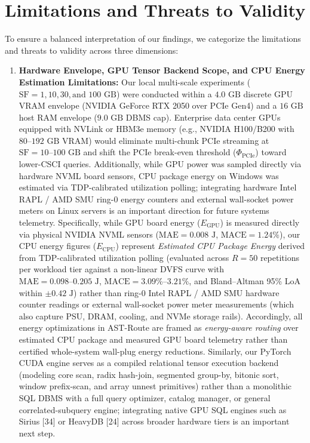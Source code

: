 \documentclass[10pt,a4paper]{article}
\begin{document}
\section{Limitations and Threats to Validity}
To ensure a balanced interpretation of our findings, we categorize the limitations and threats to validity across three dimensions:
\begin{enumerate}[leftmargin=1.5em,itemsep=2pt]
    \item \textbf{Hardware Envelope, GPU Tensor Backend Scope, and CPU Energy Estimation Limitations:} Our local multi-scale experiments ($\text{SF}=1, 10, 30, \text{and } 100\text{ GB}$) were conducted within a $4.0\text{ GB}$ discrete GPU VRAM envelope (NVIDIA GeForce RTX 2050 over PCIe Gen4) and a $16\text{ GB}$ host RAM envelope ($9.0\text{ GB}$ DBMS cap). Enterprise data center GPUs equipped with NVLink or HBM3e memory (e.g., NVIDIA H100/B200 with $80\text{--}192\text{ GB}$ VRAM) would eliminate multi-chunk PCIe streaming at $\text{SF}=10\text{--}100\text{ GB}$ and shift the PCIe break-even threshold ($\Phi_{\text{PCIe}}$) toward lower-CSCI queries. Additionally, while GPU power was sampled directly via hardware NVML board sensors, CPU package energy on Windows was estimated via TDP-calibrated utilization polling; integrating hardware Intel RAPL / AMD SMU ring-0 energy counters and external wall-socket power meters on Linux servers is an important direction for future systems telemetry. Specifically, while GPU board energy ($E_{\text{GPU}}$) is measured directly via physical NVIDIA NVML sensors ($\text{MAE}=0.008\text{ J}$, $\text{MACE}=1.24\%$), our CPU energy figures ($E_{\text{CPU}}$) represent \emph{Estimated CPU Package Energy} derived from TDP-calibrated utilization polling (evaluated across $R=50$ repetitions per workload tier against a non-linear DVFS curve with $\text{MAE}=0.098\text{--}0.205\text{ J}$, $\text{MACE}=3.09\%\text{--}3.21\%$, and Bland--Altman 95\% LoA within $\pm 0.42\text{ J}$) rather than ring-0 Intel RAPL / AMD SMU hardware counter readings or external wall-socket power meter measurements (which also capture PSU, DRAM, cooling, and NVMe storage rails). Accordingly, all energy optimizations in AST-Route are framed as \emph{energy-aware routing} over estimated CPU package and measured GPU board telemetry rather than certified whole-system wall-plug energy reductions. Similarly, our PyTorch CUDA engine serves as a compiled relational tensor execution backend (modeling core scan, radix hash-join, segmented group-by, bitonic sort, window prefix-scan, and array unnest primitives) rather than a monolithic SQL DBMS with a full query optimizer, catalog manager, or general correlated-subquery engine; integrating native GPU SQL engines such as Sirius [34] or HeavyDB [24] across broader hardware tiers is an important next step.

\end{enumerate}
\end{document}
